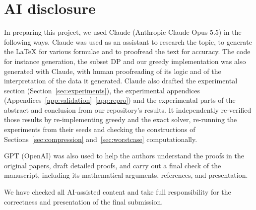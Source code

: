 \documentclass[11pt,a4paper]{article}   %
\theoremstyle{compact}
\theoremstyle{compactdef}
\begin{document}
\label{endofbody}   %



\section{AI disclosure}\label{sec:ai-use}

In preparing this project, we used Claude (Anthropic Claude Opus 5.5) in the following ways.
Claude was used as an assistant to research the topic, to generate the LaTeX for various formulae and to proofread the text for accuracy.
The code for instance generation, the subset DP and our greedy implementation
was also generated with Claude, with human proofreading of its logic and of the interpretation of the data it generated.
Claude also drafted the experimental section (Section~\ref{sec:experiments}), the experimental
appendices (Appendices~\ref{app:validation}--\ref{app:repro}) and the experimental parts of the
abstract and conclusion from our repository's results. It independently re-verified those results
by re-implementing greedy and the exact solver, re-running the experiments from their seeds and
checking the constructions of Sections~\ref{sec:compression} and~\ref{sec:worstcase} computationally.

GPT (OpenAI) was also used to help the authors understand the proofs in the
original papers, draft detailed proofs, and carry out a final check of the
manuscript, including its mathematical arguments, references, and presentation.

We have checked all AI-assisted content and take full responsibility for the correctness and presentation of the final submission.
\end{document}
